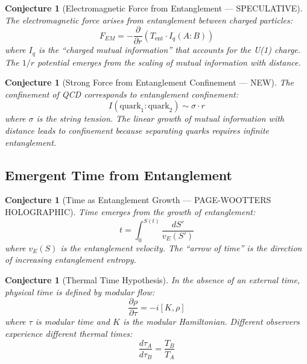\documentclass[12pt,a4paper]{article}
\newtheorem{conjecture}[theorem]{Conjecture}
\begin{document}
\begin{conjecture}[Electromagnetic Force from Entanglement --- SPECULATIVE]
The electromagnetic force arises from entanglement between charged particles:
\begin{equation}
F_{EM} = -\frac{\partial}{\partial r} \left( T_{\text{ent}} \cdot I_q(A:B) \right)
\end{equation}
where $I_q$ is the ``charged mutual information'' that accounts for the U(1) charge. The $1/r$ potential emerges from the scaling of mutual information with distance.
\end{conjecture}

\begin{conjecture}[Strong Force from Entanglement Confinement --- NEW]
The confinement of QCD corresponds to entanglement confinement:
\begin{equation}
I(\text{quark}_1 : \text{quark}_2) \sim \sigma \cdot r
\end{equation}
where $\sigma$ is the string tension. The linear growth of mutual information with distance leads to confinement because separating quarks requires infinite entanglement.
\end{conjecture}

\subsection{Emergent Time from Entanglement}

\begin{conjecture}[Time as Entanglement Growth --- PAGE-WOOTTERS HOLOGRAPHIC]
Time emerges from the growth of entanglement:
\begin{equation}
t = \int_0^{S(t)} \frac{dS'}{v_E(S')}
\end{equation}
where $v_E(S)$ is the entanglement velocity. The ``arrow of time'' is the direction of increasing entanglement entropy.
\end{conjecture}

\begin{conjecture}[Thermal Time Hypothesis]
In the absence of an external time, physical time is defined by modular flow:
\begin{equation}
\frac{\partial \rho}{\partial \tau} = -i[K, \rho]
\end{equation}
where $\tau$ is modular time and $K$ is the modular Hamiltonian. Different observers experience different thermal times:
\begin{equation}
\frac{d\tau_A}{d\tau_B} = \frac{T_B}{T_A}
\end{equation}
\end{conjecture}
\end{document}
